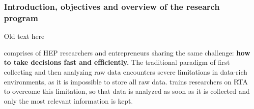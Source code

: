 


\subsubsection{Introduction, objectives and overview of the research program}
\label{sec:introRO}



\label{sub:Originality}


\Large{Old text here}


\acronym comprises of HEP researchers and entrepreneurs sharing the same challenge: \textbf{how to take decisions fast and efficiently.}
The traditional paradigm of first collecting and then analyzing raw data encounters severe limitations in data-rich environments, as it is impossible to store all raw data.
\acronym trains researchers on RTA to overcome this limitation, so that data is analyzed as soon as it is collected and only the most relevant information is kept. 


